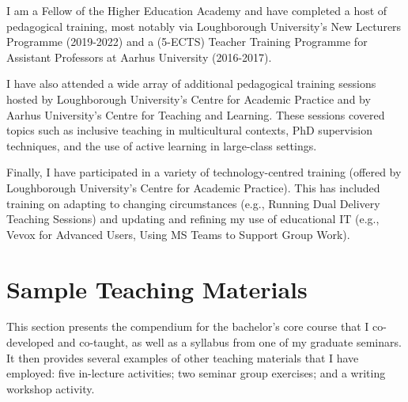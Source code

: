 \documentclass[11pt]{article}
\begin{document}
I am a Fellow of the Higher Education Academy and have completed a host of pedagogical training, most notably via Loughborough University's New Lecturers Programme (2019-2022) and a (5-ECTS) Teacher Training Programme for Assistant Professors at Aarhus University (2016-2017). 
	 
I have also attended a wide array of additional pedagogical training sessions hosted by Loughborough University's Centre for Academic Practice and by Aarhus University's Centre for Teaching and Learning. These sessions covered topics such as inclusive teaching in multicultural contexts, PhD supervision techniques, and the use of active learning in large-class settings.
		
Finally, I have participated in a variety of technology-centred training (offered by Loughborough University's Centre for Academic Practice). This has included training on adapting to changing circumstances (e.g., Running Dual Delivery Teaching Sessions) and updating and refining my use of educational IT (e.g., Vevox for Advanced Users, Using MS Teams to Support Group Work). 

\section{ Sample Teaching Materials}
\label{sec:materials}

This section presents the compendium for the bachelor's core course that I co-developed and co-taught, as well as a syllabus from one of my graduate seminars. It then provides several examples of other teaching materials that I have employed: five in-lecture activities; two seminar group exercises; and a writing workshop activity.\\
\end{document}
